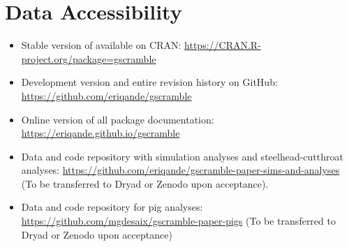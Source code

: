 \section*{Data Accessibility}

\begin{itemize}
\item Stable version of \gscramble{} available on CRAN: \url{https://CRAN.R-project.org/package=gscramble}
\item Development version and entire revision history on GitHub: \url{https://github.com/eriqande/gscramble}
\item Online version of all package documentation: \url{https://eriqande.github.io/gscramble}
\item Data and code repository with simulation analyses and steelhead-cutthroat analyses: \url{https://github.com/eriqande/gscramble-paper-sims-and-analyses} (To be transferred to Dryad or Zenodo upon acceptance).
\item Data and code repository for pig analyses: \url{https://github.com/mgdesaix/gscramble-paper-pigs} (To be transferred to Dryad or Zenodo upon acceptance)
\end{itemize}
\mbox{}

